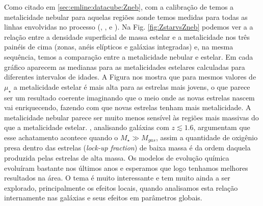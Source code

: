 Como citado em \ref{sec:emline:datacube:Zneb}, com a calibração de \citet{Marino.etal.2013a} temos a
metalicidade nebular para aquelas regiões aonde temos medidas para todas as linhas envolvidas no
processo (\Hbeta, \oIII, \Halpha e \nII). Na Fig. \ref{fig:ZstarvsZneb} podemos ver a a relação
entre a densidade superficial de massa estelar e a metalicidade nos três painéis de cima (zonas,
anéis elípticos e galáxias integradas) e, na mesma sequência, temos a comparação entre a
metalicidade nebular e estelar. Em cada gráfico aparecem as medianas para as metalicidades estelares
calculadas para diferentes intervalos de idades. A Figura nos mostra que para mesmos valores de
$\mu_\star$ a metalicidade estelar é mais alta para as estrelas mais jovens, o que parece ser um
resultado coerente imaginando que o meio onde as novas estrelas nascem vai enriquecendo, fazendo com
que novas estrelas tenham mais metalicidade. A metalicidade nebular parece ser muito menos sensível
às regiões mais massivas do que a metalicidade estelar. \citet{Zahid.etal.2014a}, analisando
galáxias com $z \lesssim 1.6$, argumentam que esse achatamento acontece quando o $M_\star \gg
M_{gas}$, assim a quantidade de oxigênio presa dentro das estrelas ({\em lock-up fraction}) de baixa
massa é da ordem daquela produzida pelas estrelas de alta massa. Os modelos de evolução química
evoluíram bastante nos últimos anos \citep[e.g., ][]{Lilly.etal.2013a, Peng.Maiolino.2014a,
Ascasibar.etal.2015a, Peng.Maiolino.Cochrane.2015a} e esperamos que logo tenhamos melhores
resultados na área. O tema é muito interessante e tem muito ainda a ser explorado, principalmente os
efeitos locais, quando analisamos esta relação internamente nas galáxias e seus efeitos em
parâmetros globais.


